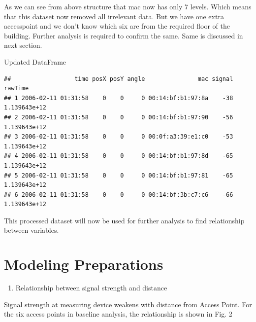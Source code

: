 \documentclass[
]{article}
\providecommand{\tightlist}{%
  \setlength{\itemsep}{0pt}\setlength{\parskip}{0pt}}
\begin{document}
As we can see from above structure that mac now has only 7 levels. Which
means that this dataset now removed all irrelevant data. But we have one
extra accesspoint and we don't know which six are from the required
floor of the building. Further analysis is required to confirm the same.
Same is discussed in next section.

Updated DataFrame

\begin{verbatim}
##                  time posX posY angle               mac signal      rawTime
## 1 2006-02-11 01:31:58    0    0     0 00:14:bf:b1:97:8a    -38 1.139643e+12
## 2 2006-02-11 01:31:58    0    0     0 00:14:bf:b1:97:90    -56 1.139643e+12
## 3 2006-02-11 01:31:58    0    0     0 00:0f:a3:39:e1:c0    -53 1.139643e+12
## 4 2006-02-11 01:31:58    0    0     0 00:14:bf:b1:97:8d    -65 1.139643e+12
## 5 2006-02-11 01:31:58    0    0     0 00:14:bf:b1:97:81    -65 1.139643e+12
## 6 2006-02-11 01:31:58    0    0     0 00:14:bf:3b:c7:c6    -66 1.139643e+12
\end{verbatim}

This processed dataset will now be used for further analysis to find
relationship between variables.

\newpage

\hypertarget{modeling-preparations}{%
\section{Modeling Preparations}\label{modeling-preparations}}

\begin{enumerate}
\def\labelenumi{\arabic{enumi}.}
\tightlist
\item
  Relationship between signal strength and distance
\end{enumerate}

Signal strength at measuring device weakens with distance from Access
Point. For the six access points in baseline analysis, the relationship
is shown in Fig. 2
\end{document}
